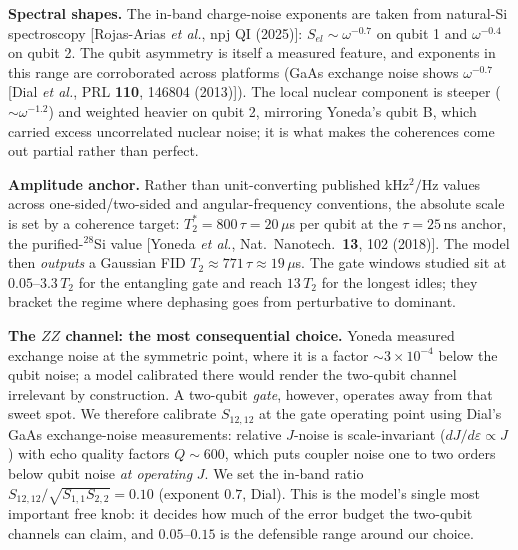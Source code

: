 \documentclass[10pt]{article}
\begin{document}
\textbf{Spectral shapes.} The in-band charge-noise exponents are taken from
natural-Si spectroscopy [Rojas-Arias \emph{et al.}, npj QI (2025)]:
$S_{el} \sim \omega^{-0.7}$ on qubit 1 and $\omega^{-0.4}$ on qubit 2. The
qubit asymmetry is itself a measured feature, and exponents in this range
are corroborated across platforms (GaAs exchange noise shows
$\omega^{-0.7}$ [Dial \emph{et al.}, PRL \textbf{110}, 146804 (2013)]). The
local nuclear component is steeper ($\sim\omega^{-1.2}$) and weighted heavier
on qubit 2, mirroring Yoneda's qubit B, which carried excess uncorrelated
nuclear noise; it is what makes the coherences come out partial rather than
perfect.

\textbf{Amplitude anchor.} Rather than unit-converting published
$\mathrm{kHz^2/Hz}$ values across one-sided/two-sided and angular-frequency
conventions, the absolute scale is set by a coherence target: $T_2^{*} =
800\,\tau = 20\,\mu$s per qubit at the $\tau = 25$\,ns anchor, the
purified-$^{28}$Si value [Yoneda \emph{et al.}, Nat.\ Nanotech.\ \textbf{13},
102 (2018)]. The model then \emph{outputs} a Gaussian FID $T_2 \approx
771\,\tau \approx 19\,\mu$s. The gate windows studied sit at
$0.05$--$3.3\,T_2$ for the entangling gate and reach $13\,T_2$ for the
longest idles; they bracket the regime where dephasing goes from
perturbative to dominant.

\textbf{The $ZZ$ channel: the most consequential choice.} Yoneda measured
exchange noise at the symmetric point, where it is a factor $\sim 3\times
10^{-4}$ below the qubit noise; a model calibrated there would render the
two-qubit channel irrelevant by construction. A two-qubit \emph{gate},
however, operates away from that sweet spot. We therefore calibrate
$S_{12,12}$ at the gate operating point using Dial's GaAs exchange-noise
measurements: relative $J$-noise is scale-invariant ($dJ/d\varepsilon \propto
J$) with echo quality factors $Q \sim 600$, which puts coupler noise one to
two orders below qubit noise \emph{at operating} $J$. We set the in-band
ratio $S_{12,12}/\sqrt{S_{1,1}S_{2,2}} = 0.10$ (exponent $0.7$, Dial). This
is the model's single most important free knob: it decides how much of the
error budget the two-qubit channels can claim, and $0.05$--$0.15$ is the
defensible range around our choice.
\end{document}
